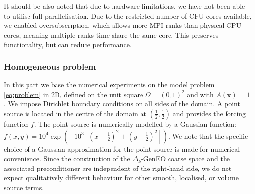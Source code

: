 \documentclass[preprint,3p,times]{elsarticle}
\newcommand{\bx}{\bm{x}}
\theoremstyle{definition}
\numberwithin{equation}{section}
\begin{document}
It should be also noted that due to hardware limitations, we have not been able to utilise full parallelisation. Due to the restricted number of CPU cores available, we enabled oversubscription, which allows more MPI ranks than physical CPU cores, meaning multiple ranks time-share the same core. This preserves functionality, but can reduce performance. 

\subsubsection{Homogeneous problem}
\label{sec:HomProb}
In this part we base the numerical experiments on the model problem \eqref{eq:problem} in 2D, defined on the unit square $\Omega = (0,1)^2$ and with $A(\bx) = 1$. We impose Dirichlet boundary conditions on all sides of the domain. A point source is located in the centre of the domain at $(\frac{1}{2},\frac{1}{2})$ and provides the forcing function $f$. {The point source is numerically modelled by a Gaussian function:
\(f(x,y)=10^4 \exp(-10^3[(x-\frac{1}{2})^2+(y-\frac{1}{2})^2])\).} {We note that the specific choice of a Gaussian approximation for the point source is made for numerical convenience. Since the construction of the $\Delta_k$-GenEO coarse space and the associated preconditioner are independent of the right-hand side, we do not expect qualitatively different behaviour for other smooth, localised, or volume source terms.}
\end{document}
